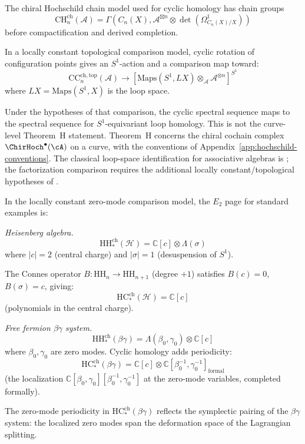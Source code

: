 \begin{construction}
The chiral Hochschild chain model used for cyclic homology has
chain groups
\[
\mathrm{CH}^{\mathrm{ch}}_n(\mathcal{A}) =
\Gamma(C_n(X),
 \mathcal{A}^{\boxtimes n} \otimes \det(\Omega^1_{C_n(X)/X}))\]
before compactification and derived completion.

In a locally constant topological comparison model, cyclic rotation of
configuration points gives an $S^1$-action and a comparison map toward:
\[
\mathrm{CC}^{\mathrm{ch,top}}_n(\mathcal{A}) \longrightarrow
 [\mathrm{Maps}(S^1, LX) \otimes_{\mathcal{A}} \mathcal{A}^{\otimes n}]^{S^1}
\]
where $LX = \text{Maps}(S^1, X)$ is the loop space.

Under the hypotheses of that comparison, the cyclic spectral sequence
maps to the spectral sequence for $S^1$-equivariant loop homology.
This is not the curve-level Theorem~H statement. Theorem~H concerns
the chiral cochain complex $\ChirHoch^\bullet(\cA)$ on a curve, with
the conventions of Appendix~\ref{app:hochschild-conventions}.
The classical loop-space identification for associative algebras is
\cite{Loday98}; the factorization comparison requires the additional
locally constant/topological hypotheses of \cite[Chapter~5]{CG17}.
\end{construction}

\begin{computation}
In the locally constant zero-mode comparison model, the $E_2$ page for
standard examples is:

\emph{Heisenberg algebra.}
\[\text{HH}_*^{\text{ch}}(\mathcal{H}) = \mathbb{C}[c] \otimes \Lambda(\sigma)\]
where $|c| = 2$ (central charge) and $|\sigma| = 1$ (desuspension of $S^1$).

The Connes operator $B: \text{HH}_n \to \text{HH}_{n+1}$ (degree $+1$) satisfies $B(c) = 0$,
$B(\sigma) = c$, giving:
\[\text{HC}_*^{\text{ch}}(\mathcal{H}) = \mathbb{C}[c]\]
(polynomials in the central charge).

\emph{Free fermion $\beta\gamma$ system.}
\[\text{HH}_*^{\text{ch}}(\beta\gamma) = \Lambda(\beta_0, \gamma_0) \otimes \mathbb{C}[c]\]
where $\beta_0, \gamma_0$ are zero modes. Cyclic homology adds periodicity:
\[\text{HC}_*^{\text{ch}}(\beta\gamma) = \mathbb{C}[c] \otimes
 \mathbb{C}[\beta_0^{-1}, \gamma_0^{-1}]_{\text{formal}}\]
(the localization $\mathbb{C}[\beta_0, \gamma_0][\beta_0^{-1}, \gamma_0^{-1}]$ at the zero-mode variables, completed formally).

The zero-mode periodicity in $\text{HC}_*^{\text{ch}}(\beta\gamma)$ reflects the symplectic pairing of the $\beta\gamma$ system: the localized zero modes span the deformation space of the Lagrangian splitting.
\end{computation}

